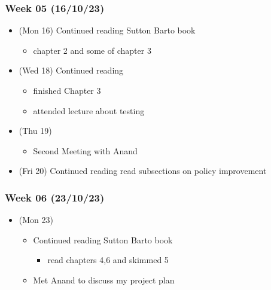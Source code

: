 \hypertarget{week-05-161023}{%
\subsubsection{Week 05 (16/10/23)}\label{week-05-161023}}

\begin{itemize}
\tightlist
\item
  (Mon 16) Continued reading Sutton Barto book

  \begin{itemize}
  \tightlist
  \item
    chapter 2 and some of chapter 3
  \end{itemize}
\item
  (Wed 18) Continued reading

  \begin{itemize}
  \tightlist
  \item
    finished Chapter 3
  \item
    attended lecture about testing
  \end{itemize}
\item
  (Thu 19)

  \begin{itemize}
  \tightlist
  \item
    Second Meeting with Anand
  \end{itemize}
\item
  (Fri 20) Continued reading read subsections on policy improvement
\end{itemize}

\hypertarget{week-06-231023}{%
\subsubsection{Week 06 (23/10/23)}\label{week-06-231023}}

\begin{itemize}
\tightlist
\item
  (Mon 23)

  \begin{itemize}
  \tightlist
  \item
    Continued reading Sutton Barto book

    \begin{itemize}
    \tightlist
    \item
      read chapters 4,6 and skimmed 5
    \end{itemize}
  \item
    Met Anand to discuss my project plan
  \end{itemize}
\end{itemize}


